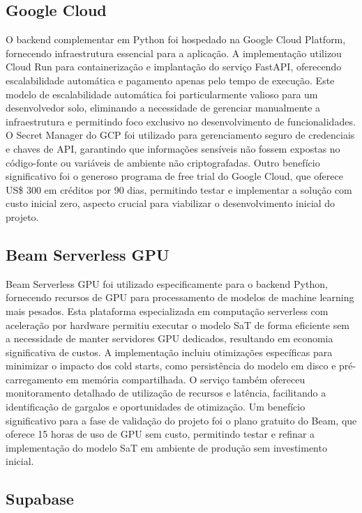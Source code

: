 \documentclass[tcc,capa]{texufpel}
\begin{document}
\subsection{Google Cloud}
O backend complementar em Python foi hospedado na Google Cloud Platform, fornecendo infraestrutura essencial para a aplicação. A implementação utilizou Cloud Run para containerização e implantação do serviço FastAPI, oferecendo escalabilidade automática e pagamento apenas pelo tempo de execução. Este modelo de escalabilidade automática foi particularmente valioso para um desenvolvedor solo, eliminando a necessidade de gerenciar manualmente a infraestrutura e permitindo foco exclusivo no desenvolvimento de funcionalidades. O Secret Manager do GCP foi utilizado para gerenciamento seguro de credenciais e chaves de API, garantindo que informações sensíveis não fossem expostas no código-fonte ou variáveis de ambiente não criptografadas. Outro benefício significativo foi o generoso programa de free trial do Google Cloud, que oferece US\$ 300 em créditos por 90 dias, permitindo testar e implementar a solução com custo inicial zero, aspecto crucial para viabilizar o desenvolvimento inicial do projeto.

\subsection{Beam Serverless GPU}
Beam Serverless GPU foi utilizado especificamente para o backend Python, fornecendo recursos de GPU para processamento de modelos de machine learning mais pesados. Esta plataforma especializada em computação serverless com aceleração por hardware permitiu executar o modelo SaT de forma eficiente sem a necessidade de manter servidores GPU dedicados, resultando em economia significativa de custos. A implementação incluiu otimizações específicas para minimizar o impacto dos cold starts, como persistência do modelo em disco e pré-carregamento em memória compartilhada. O serviço também ofereceu monitoramento detalhado de utilização de recursos e latência, facilitando a identificação de gargalos e oportunidades de otimização. Um benefício significativo para a fase de validação do projeto foi o plano gratuito do Beam, que oferece 15 horas de uso de GPU sem custo, permitindo testar e refinar a implementação do modelo SaT em ambiente de produção sem investimento inicial.

\subsection{Supabase}
\end{document}
